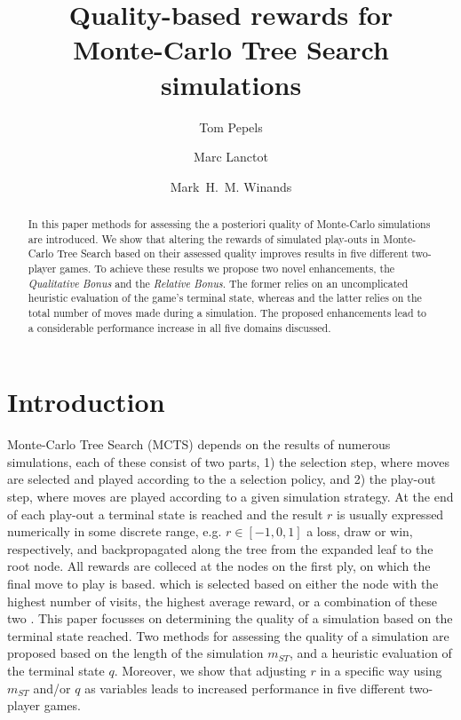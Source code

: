 \documentclass{ecai2010}
\begin{document}
\title{Quality-based rewards for \\ Monte-Carlo Tree Search simulations}

\author{Tom Pepels \and Marc Lanctot \and Mark~H.~M. Winands  }

\maketitle


\begin{abstract}
In this paper methods for assessing the a posteriori quality of Monte-Carlo simulations are introduced. We show that altering the rewards of simulated play-outs in Monte-Carlo Tree Search based on their assessed quality improves results in five different two-player games. To achieve these results we propose two novel enhancements, the \emph{Qualitative Bonus} and the \emph{Relative Bonus}. The former relies on an uncomplicated heuristic evaluation of the game's terminal state, whereas and the latter relies on the total number of moves made during a simulation. The proposed enhancements lead to a considerable performance increase in all five domains discussed.
\end{abstract}

\section{Introduction}
\label{sec:intro}
Monte-Carlo Tree Search (MCTS) depends on the results of numerous simulations, each of these  consist of two parts, 1) the selection step, where moves are selected and played according to the a selection policy, and 2) the play-out step, where moves are played according to a given simulation strategy. At the end of each play-out a terminal state is reached and the result $r$ is usually expressed numerically in some discrete range, e.g. $r \in [-1, 0, 1]$ a loss, draw or win, respectively, and backpropagated along the tree from the expanded leaf to the root node. All rewards are colleced at the nodes on the first ply, on which the final move to play is based. which is selected based on either the node with the highest number of visits, the highest average reward, or a combination of these two \cite{chaslot2008progressive}. This paper focusses on determining the quality of a simulation based on the terminal state reached. Two methods for assessing the quality of a simulation are proposed based on the length of the simulation $m_{ST}$, and a heuristic evaluation of the terminal state $q$. Moreover, we show that adjusting $r$ in a specific way using  $m_{ST}$ and/or $q$ as variables leads to increased performance in five different two-player games.
\end{document}
